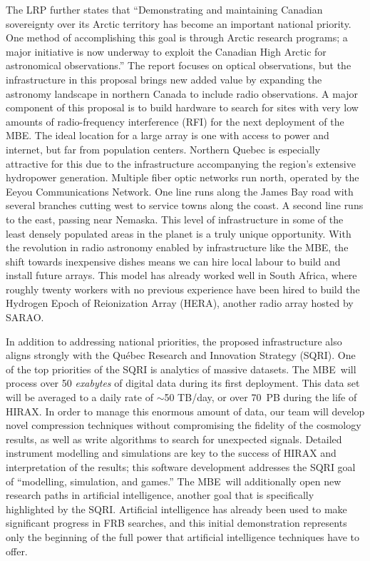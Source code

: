 \documentclass[letterpaper,11pt,preprint]{aastex}
\newcommand{\mbe}{{\rm MBE}}
\begin{document}
The LRP further states that ``Demonstrating and maintaining Canadian
sovereignty over its Arctic territory has become an important national
priority. One method of accomplishing this goal is through Arctic
research programs; a major initiative is now underway to exploit the
Canadian High Arctic for astronomical observations.''  The report
focuses on optical observations, but the infrastructure in this
proposal brings new added value by expanding the astronomy landscape
in northern Canada to include radio observations.  A major component
of this proposal is to build hardware to search for sites with very
low amounts of radio-frequency interference (RFI) for the next
deployment of the \mbe.  The ideal location for a large array is one
with access to power and internet, but far from population centers.
Northern Quebec is especially attractive for this due to the
infrastructure accompanying the region's extensive hydropower
generation.  Multiple fiber optic networks run north, operated by the
Eeyou Communications Network.  One line runs along the James Bay road
with several branches cutting west to service towns along the coast.
A second line runs to the east, passing near Nemaska.  This level of
infrastructure in some of the least densely populated areas in the
planet is a truly unique opportunity.  With the revolution in radio
astronomy enabled by infrastructure like the \mbe, the shift towards
inexpensive dishes means we can hire local labour to build and install
future arrays.  This model has already worked well in South Africa,
where roughly twenty workers with no previous experience have been
hired to build the Hydrogen Epoch of Reionization Array (HERA),
another radio array hosted by SARAO.

In addition to addressing national priorities, the proposed
infrastructure also aligns strongly with the Qu\'ebec Research and
Innovation Strategy (SQRI).  One of the top priorities of the SQRI is
analytics of massive datasets.  The \mbe\ will process over 50 {\it
  exabytes} of digital data during its first deployment.  This data
set will be averaged to a daily rate of $\sim$50 TB/day, or over 70~PB
during the life of HIRAX.  In order to manage this enormous amount of
data, our team will develop novel compression techniques without
compromising the fidelity of the cosmology results, as well as write
algorithms to search for unexpected signals.  Detailed instrument
modelling and simulations are key to the success of HIRAX and
interpretation of the results; this software development addresses the
SQRI goal of ``modelling, simulation, and games.''  The \mbe\ will
additionally open new research paths in artificial intelligence,
another goal that is specifically highlighted by the SQRI.  Artificial
intelligence has already been used to make significant progress in FRB
searches, and this initial demonstration represents only the beginning
of the full power that artificial intelligence techniques have to
offer.
\end{document}
